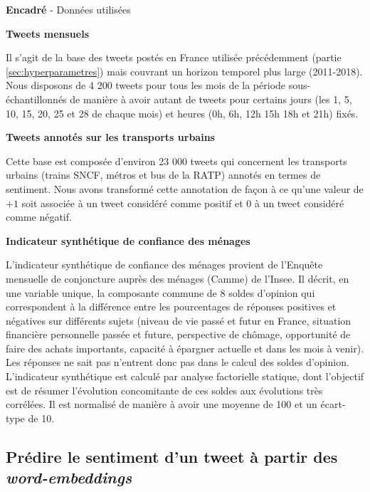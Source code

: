 \documentclass[11pt,french,french]{article}
\newcounter{comptEncadre}
\renewcommand\thecomptEncadre{%
\arabic{comptEncadre}}
\newenvironment{encadre}[2][false]{\refstepcounter{comptEncadre}
\begin{bclogo}[couleur=processblue!5,arrondi=0.1,
logo=\bcloupe,barre=none,couleurBord=blue!60!green,nobreak = #1]{ {\sc \textbf{Encadré \thecomptEncadre}} -  #2}
\smallskip
}{\end{bclogo}}
\begin{document}
\begin{encadre}[true]{Données utilisées}\label{enc:encadre1}

\small

\textbf{Tweets mensuels}

Il s'agit de la base des tweets postés en France utilisée précédemment (partie  \ref{sec:hyperparametres}) mais couvrant un horizon temporel plus large (2011-2018).
Nous disposons de 4 200 tweets pour tous les mois de la période sous-échantillonnés de manière à avoir autant de tweets pour certains jours (les 1, 5, 10, 15, 20, 25 et 28 de chaque mois) et heures (0h, 6h, 12h 15h 18h et 21h) fixés. 

\textbf{Tweets annotés sur les transports urbains}

Cette base est composée d'environ 23 000 tweets qui concernent les transports urbains (trains SNCF, métros et bus de la RATP) annotés en termes de sentiment.
Nous avons transformé cette annotation de façon à ce qu'une valeur de $+1$ soit associée à un tweet considéré comme positif et $0$ à un tweet considéré comme négatif.


\textbf{Indicateur synthétique de confiance des ménages}

L’indicateur synthétique de confiance des ménages provient de l'Enquête mensuelle de conjoncture auprès des ménages (Camme) de l’Insee.
Il décrit, en une variable unique, la composante commune de 8 soldes d’opinion qui correspondent à la différence entre les pourcentages de réponses positives et négatives sur différents sujets (niveau de vie passé et futur en France, situation financière personnelle passée et future, perspective de chômage, opportunité de faire des achats importants, capacité à épargner actuelle et dans les mois à venir). Les réponses \og ne sait pas \fg n'entrent donc pas dans le calcul des soldes d'opinion.
L'indicateur synthétique est calculé par analyse factorielle statique, dont l’objectif est de résumer l’évolution concomitante de ces soldes aux évolutions très corrélées.
Il est normalisé de manière à avoir une moyenne de 100 et un écart-type de 10. 

\end{encadre}

\subsection{\texorpdfstring{Prédire le sentiment d'un tweet à partir des
\emph{word-embeddings}}{Prédire le sentiment d'un tweet à partir des word-embeddings}}\label{pruxe9dire-le-sentiment-dun-tweet-uxe0-partir-des-word-embeddings}
\end{document}
